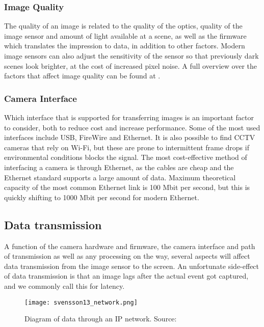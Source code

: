\subsubsection{Image Quality}
The quality of an image is related to the quality of the optics, quality of the image sensor and amount of light available at a scene, as well as the firmware which translates the impression to data, in addition to other factors.
Modern image sensors can also adjust the sensitivity of the sensor so that previously dark scenes look brighter, at the cost of increased pixel noise.
A full overview over the factors that affect image quality can be found at \citep{imatest15}.

\subsubsection{Camera Interface}
Which interface that is supported for transferring images is an important factor to consider, both to reduce cost and increase performance.
Some of the most used interfaces include USB, FireWire and Ethernet. It is also possible to find CCTV cameras that rely on Wi-Fi, but these are prone to intermittent frame drops if environmental conditions blocks the signal.
The most cost-effective method of interfacing a camera is through Ethernet, as the cables are cheap and the Ethernet standard supports a large amount of data. Maximum theoretical capacity of the most common Ethernet link is 100 Mbit per second, but this is quickly shifting to 1000 Mbit per second for modern Ethernet.

\subsection{Data transmission}
A function of the camera hardware and firmware, the camera interface and path of transmission as well as any processing on the way, several aspects will affect data transmission from the image sensor to the screen. An unfortunate side-effect of data transmission is that an image lags after the actual event got captured, and we commonly call this for latency.

\begin{figure}[ht]
    \centering
    \texttt{[image: svensson13\_network.png]}
    \caption{Diagram of data through an IP network. Source: \citet{svensson13}}
    \label{fig:svensson13_network}
\end{figure}
\FloatBarrier

